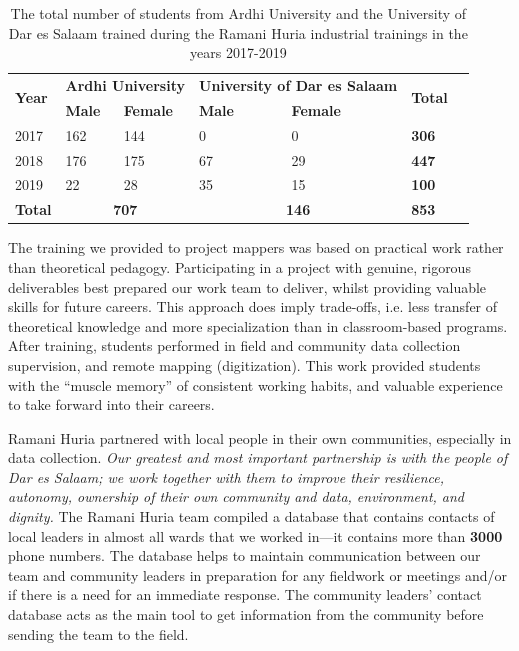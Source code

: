 \documentclass[a4paper,12pt,twoside]{article}
\begin{document}
\begin{table}[h!]
\begin{center}
\begin{tabular}{|p{2cm}|p{2cm}|p{2cm}|p{2.5cm}|p{2.5cm}|p{2cm}|p{1.5cm}|}
\hline 
\multirow{2}{*}{\bfseries Year} & \multicolumn{2}{|c|}{\bfseries Ardhi University} & \multicolumn{2}{|c|}{\bfseries University of Dar es Salaam} & \multirow{2}{*}{\bfseries Total}\\
\cline{2-5}
  {} & \bfseries Male & \bfseries Female & \bfseries Male & \bfseries Female & {}\\
  \hline
  2017 & 162 & 144 & 0 & 0 & \bfseries 306\\
  \hline
  2018 & 176 & 175 & 67 & 29 & \bfseries 447\\
  \hline
  2019 & 22 & 28 & 35 & 15 & \bfseries 100 \\
  \hline 
  \bfseries Total & \multicolumn{2}{|c|}{\bfseries 707} & \multicolumn{2}{|c|}{\bfseries 146} & \bfseries 853\\
  \hline
 \end{tabular}
  \caption{\label{tab:table-name}The total number of students from Ardhi University and the University of Dar es Salaam trained during the Ramani Huria industrial trainings in the years 2017-2019}
\end{center}
\end{table}

\begin{multicols}{2}
The training we provided to project mappers was based on practical work rather than theoretical pedagogy. Participating in a project with genuine, rigorous deliverables best prepared our work team to deliver, whilst providing valuable skills for future careers. This approach does imply trade-offs, i.e. less transfer of theoretical knowledge and more specialization than in classroom-based programs. After training, students performed in field and community data collection supervision, and remote mapping (digitization). This work provided students with the “muscle memory” of consistent working habits, and valuable experience to take forward into their careers.

Ramani Huria partnered with local people in their own communities, especially in data collection. \textit{Our greatest and most important partnership is with the people of Dar es Salaam; we work together with them to improve their resilience, autonomy, ownership of their own community and data, environment, and dignity.} The Ramani Huria team compiled a database that contains contacts of local leaders in almost all wards that we worked in---it contains more than \textbf{3000} phone numbers. The database helps to maintain communication between our team and community leaders in preparation for any fieldwork or meetings and/or if there is a need for an immediate response. The community leaders’ contact database acts as the main tool to get information from the community before sending the team to the field.
\end{multicols}
\end{document}
